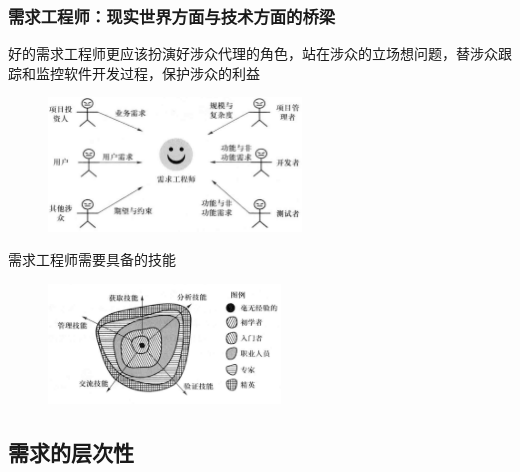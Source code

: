 \subsubsection{需求工程师：现实世界方面与技术方面的桥梁}
好的需求工程师更应该扮演好涉众代理的角色，站在涉众的立场想问题，替涉众跟踪和监控软件开发过程，保护涉众的利益
\begin{figure}[H]
	\centering
	\includegraphics[width=0.6\textwidth]{img/需求工程师的桥梁作用.png}
\end{figure}

需求工程师需要具备的技能
\begin{figure}[H]
	\centering
	\includegraphics[width=0.55\textwidth]{img/需求工程师需要具备的技能.png}
\end{figure}

\subsection{需求的层次性}












